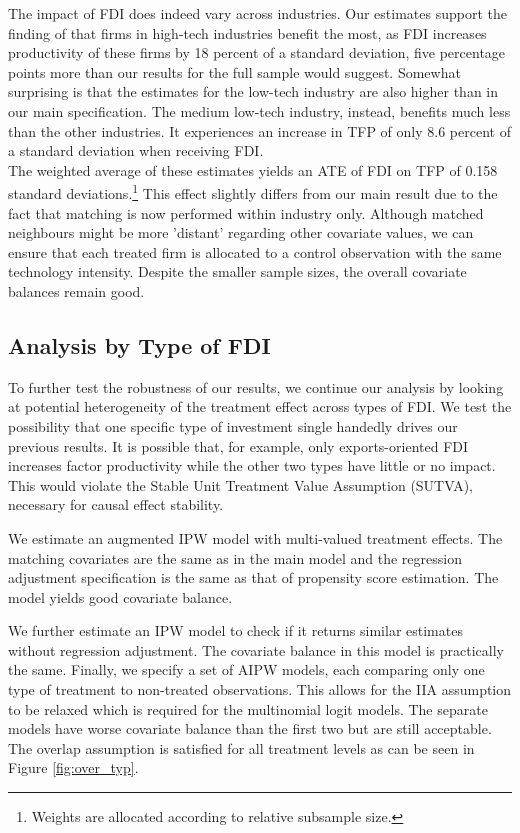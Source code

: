 \documentclass[a4paper,11pt]{scrartcl}
\begin{document}
The impact of FDI does indeed vary across industries. Our estimates support the finding of \citet{Keller2009} that firms in high-tech industries benefit the most, as FDI increases productivity of these firms by 18 percent of a standard deviation, five percentage points more than our results for the full sample would suggest. Somewhat surprising is that the estimates for the low-tech industry are also higher than in our main specification. The medium low-tech industry, instead, benefits much less than the other industries. It experiences an increase in TFP of only 8.6 percent of a standard deviation when receiving FDI. \\

The weighted average of these estimates yields an ATE of FDI on TFP of 0.158 standard deviations.\footnote{Weights are allocated according to relative subsample size.} This effect slightly differs from our main result due to the fact that matching is now performed within industry only. Although matched neighbours might be more 'distant' regarding other covariate values, we can ensure that each treated firm is allocated to a control observation with the same technology intensity. Despite the smaller sample sizes, the overall covariate balances remain good. 


\subsection{Analysis by Type of FDI}

To further test the robustness of our results, we continue our analysis by looking at potential heterogeneity of the treatment effect across types of FDI. We test the possibility that one specific type of investment single handedly drives our previous results. It is possible that, for example, only exports-oriented FDI increases factor productivity while the other two types have little or no impact. This would violate the Stable Unit Treatment Value Assumption (SUTVA), necessary for causal effect stability. 

We estimate an augmented IPW%
 model with multi-valued treatment effects. The matching covariates are the same as in the main model and the regression adjustment specification is the same as that of propensity score estimation. The model yields good covariate balance.

We further estimate an IPW model to check if it returns similar estimates without regression adjustment. The covariate balance in this model is practically the same. Finally, we specify a set of AIPW models, each comparing only one type of treatment to non-treated observations. This allows for the IIA assumption%
 to be relaxed which is required for the multinomial logit models. The separate models have worse covariate balance than the first two but are still acceptable. The overlap assumption is satisfied for all treatment levels as can be seen in Figure \ref{fig:over_typ}. %
\end{document}
